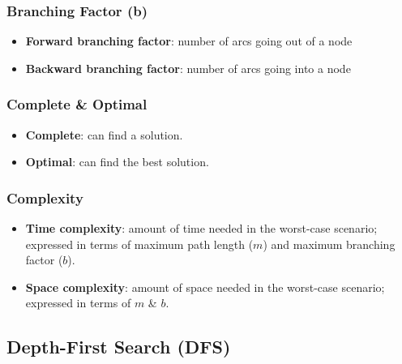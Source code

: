 \documentclass{article}
\begin{document}
\subsubsection{Branching Factor (b)}

\begin{itemize}
    \item \textbf{Forward branching factor}: number of arcs going out of a node
    \item \textbf{Backward branching factor}: number of arcs going into a node
\end{itemize}

\subsubsection{Complete \& Optimal}

\begin{itemize}
    \item \textbf{Complete}: can find a solution.
    \item \textbf{Optimal}: can find the best solution.
\end{itemize}

\subsubsection{Complexity}

\begin{itemize}
    \item \textbf{Time complexity}: amount of time needed in the worst-case scenario; expressed in terms of maximum path length ($m$) and maximum branching factor ($b$).
    \item \textbf{Space complexity}: amount of space needed in the worst-case scenario; expressed in terms of $m$ \& $b$.
\end{itemize}

\subsection{Depth-First Search (DFS)}
\end{document}
